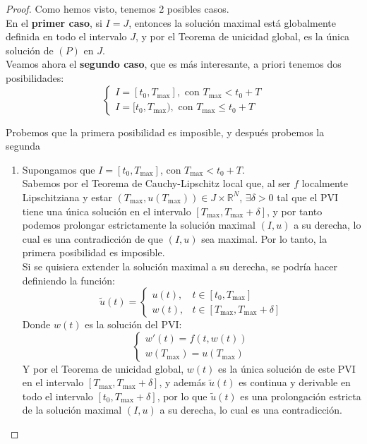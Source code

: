 \begin{proof}
    Como hemos visto, tenemos 2 posibles casos.\\

    En el \textbf{primer caso}, si $I = J$, entonces la solución maximal está globalmente definida en todo el intervalo $J$, y por el Teorema de unicidad global, es la única solución de $(P)$ en $J$.\\

    Veamos ahora el \textbf{segundo caso}, que es más interesante, a priori tenemos dos posibilidades:
    \[
        \begin{cases}
            I = [t_0, T_{\text{max}}], \text{ con } T_{\text{max}} < t_0 + T \\
            \boxed{I = [t_0, T_{\text{max}}), \text{ con } T_{\text{max}} \leq t_0 + T}
        \end{cases}
    \]

    Probemos que la primera posibilidad es imposible, y después probemos la segunda
    \begin{enumerate}
        \item Supongamos que $I = [t_0, T_{\text{max}}]$, con $T_{\text{max}} < t_0 + T$.\\
        Sabemos por el Teorema de Cauchy-Lipschitz local que, al ser $f$ localmente Lipschitziana y estar $(T_{\text{max}}, u(T_{\text{max}})) \in J \times \mathbb{R}^N$, $\exists \delta > 0$ tal que el PVI tiene una única solución en el intervalo $[T_{\text{max}}, T_{\text{max}} + \delta]$, y por tanto podemos prolongar estrictamente la solución maximal $(I, u)$ a su derecha, lo cual es una contradicción de que $(I, u)$ sea maximal. Por lo tanto, la primera posibilidad es imposible.\\

        Si se quisiera extender la solución maximal a su derecha, se podría hacer definiendo la función:
        \[
            \widetilde{u}(t) =
            \begin{cases}
                u(t), & t \in [t_0, T_{\text{max}}] \\
                w(t), & t \in [T_{\text{max}}, T_{\text{max}} + \delta]
            \end{cases}
        \]
        Donde $w(t)$ es la solución del PVI:
        \[
            \begin{cases}
                w'(t) = f(t, w(t)) \\
                w(T_{\text{max}}) = u(T_{\text{max}})
            \end{cases}
        \]
        Y por el Teorema de unicidad global, $w(t)$ es la única solución de este PVI en el intervalo $[T_{\text{max}}, T_{\text{max}} + \delta]$, y además $\widetilde{u}(t)$ es continua y derivable en todo el intervalo $[t_0, T_{\text{max}} + \delta]$, por lo que $\widetilde{u}(t)$ es una prolongación estricta de la solución maximal $(I, u)$ a su derecha, lo cual es una contradicción.\\


\end{enumerate}
\end{proof}
